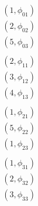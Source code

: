 \begin{align*}
&(1,\phi_{01})\\
&(2,\phi_{02})\\
&(5,\phi_{03})\\
\\
&(2,\phi_{11})\\
&(3,\phi_{12})\\
&(4,\phi_{13})\\
\\
&(1,\phi_{21})\\
&(5,\phi_{22})\\
&(1,\phi_{23})\\
\\
&(1,\phi_{31})\\
&(2,\phi_{32})\\
&(3,\phi_{33})\\
\end{align*}
